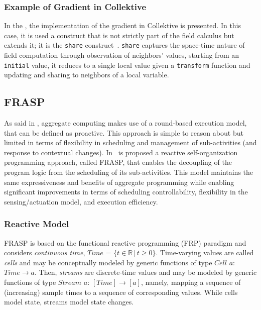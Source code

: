 \subsubsection{Example of Gradient in Collektive}

In the , the implementation of the gradient in Collektive is presented. In this case, it is used a construct that is not strictly part of the field calculus but extends it; it is the \texttt{share} construct~\cite{https://doi.org/10.48550/arxiv.1910.02874}. \texttt{share} captures the space-time nature of field computation through observation of neighbors' values, starting from an \texttt{initial} value, it reduces to a single local value given a \texttt{transform} function and updating and sharing to neighbors of a local variable.



\subsection{FRASP}
\label{section:frasp}

As said in , aggregate computing makes use of a round-based execution model, that can be defined as proactive. This approach is simple to reason about but limited in terms of flexibility in scheduling and management of sub-activities (and response to contextual changes). In~\cite{Casadei2023} is proposed a reactive self-organization programming approach, called FRASP, that enables the decoupling of the program logic from the scheduling of its sub-activities. This model maintains the same expressiveness and benefits of aggregate programming while enabling significant improvements in terms of scheduling controllability, flexibility in the sensing/actuation model, and execution efficiency.

\subsubsection{Reactive Model}
\label{subsubsection:reactive-model}
FRASP is based on the functional reactive programming (FRP) paradigm and considers \textit{continuous time}, $Time$ = $\{ t \in \mathbb{R} \, | \, t \geq 0 \}$. Time-varying values are called \textit{cells} and may be conceptually modeled by generic functions of type $Cell$ $a$: $Time \rightarrow a$. Then, \textit{streams} are discrete-time values and may be modeled by generic functions of type $Stream$ $a$: $[Time] \rightarrow [a]$, namely, mapping a sequence of (increasing) sample times to a sequence of corresponding values. While cells model state, streams model state changes.

